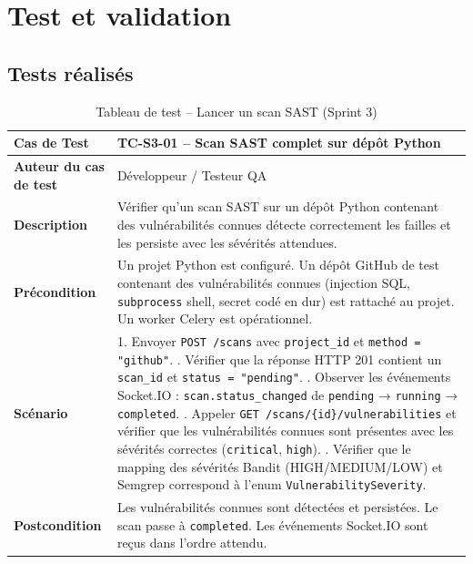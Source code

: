 \section{Test et validation}

\subsection{Tests réalisés}

\begin{table}[H]
\centering
\caption{Tableau de test -- Lancer un scan SAST (Sprint 3)}
\label{tab:test-sprint3}
\small
\renewcommand{\arraystretch}{1.3}
\begin{tabularx}{\textwidth}{>{\bfseries}p{3.5cm} X}
\hline
Cas de Test & TC-S3-01 -- Scan SAST complet sur dépôt Python \\
\hline
Auteur du cas de test & Développeur / Testeur QA \\
\hline
Description & Vérifier qu'un scan SAST sur un dépôt Python contenant des vulnérabilités connues détecte correctement les failles et les persiste avec les sévérités attendues. \\
\hline
Précondition & Un projet Python est configuré. Un dépôt GitHub de test contenant des vulnérabilités connues (injection SQL, \texttt{subprocess} shell, secret codé en dur) est rattaché au projet. Un worker Celery est opérationnel. \\
\hline
Scénario &
1. Envoyer \texttt{POST /scans} avec \texttt{project\_id} et \texttt{method = "github"}. \newline
2. Vérifier que la réponse HTTP 201 contient un \texttt{scan\_id} et \texttt{status = "pending"}. \newline
3. Observer les événements Socket.IO : \texttt{scan.status\_changed} de \texttt{pending} → \texttt{running} → \texttt{completed}. \newline
4. Appeler \texttt{GET /scans/\{id\}/vulnerabilities} et vérifier que les vulnérabilités connues sont présentes avec les sévérités correctes (\texttt{critical}, \texttt{high}). \newline
5. Vérifier que le mapping des sévérités Bandit (HIGH/MEDIUM/LOW) et Semgrep correspond à l'enum \texttt{VulnerabilitySeverity}. \\
\hline
Postcondition & Les vulnérabilités connues sont détectées et persistées. Le scan passe à \texttt{completed}. Les événements Socket.IO sont reçus dans l'ordre attendu. \\
\hline
\end{tabularx}
\end{table}

